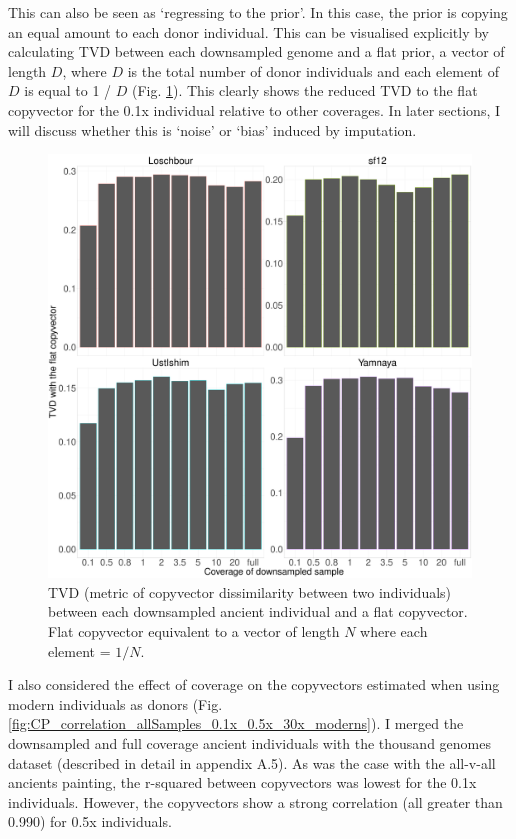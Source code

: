 This can also be seen as `regressing to the prior'. In this case, the prior is copying an equal amount to each donor individual. This can be visualised explicitly by calculating TVD between each downsampled genome and a flat prior, a vector of length $D$, where $D$ is the total number of donor individuals and each element of $D$ is equal to 1 / $D$ (Fig. \ref{fig:TVD_ancients_flat_prior}). This clearly shows the reduced TVD to the flat copyvector for the 0.1x individual relative to other coverages. In later sections, I will discuss whether this is `noise' or `bias' induced by imputation. 

\begin{figure}[htp]
    \centering
    \includegraphics[width=1.0\textwidth]{../images/chapter1/TVD_ancients_flat_prior.pdf}
    \caption{TVD (metric of copyvector dissimilarity between two individuals) between each downsampled ancient individual and a flat copyvector. Flat copyvector equivalent to a vector of length $N$ where each element = $1/N$.}
    \label{fig:TVD_ancients_flat_prior}
\end{figure}

I also considered the effect of coverage on the copyvectors estimated when using modern individuals as donors (Fig. \ref{fig:CP_correlation_allSamples_0.1x_0.5x_30x_moderns}). I merged the downsampled and full coverage ancient individuals with the thousand genomes dataset (described in detail in appendix A.5). As was the case with the all-v-all ancients painting, the r-squared between copyvectors was lowest for the 0.1x individuals. However, the copyvectors show a strong correlation (all greater than 0.990) for 0.5x individuals. 

